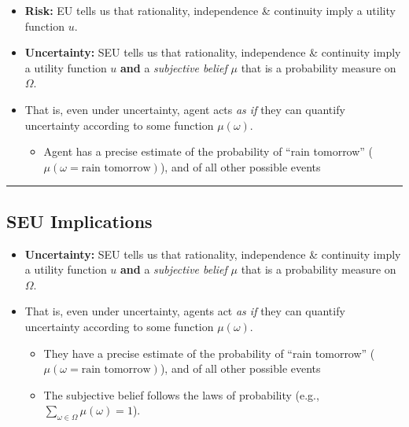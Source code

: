 \documentclass[
  letterpaper,
  DIV=11,
  numbers=noendperiod]{scrartcl}
\providecommand{\tightlist}{%
  \setlength{\itemsep}{0pt}\setlength{\parskip}{0pt}}\usepackage{longtable,booktabs,array}
\begin{document}
\begin{itemize}
\tightlist
\item
  \textbf{Risk:} EU tells us that rationality, independence \&
  continuity imply a utility function \(u\).
\item
  \textbf{Uncertainty:} SEU tells us that rationality, independence \&
  continuity imply a utility function \(u\) \textbf{and} a
  \emph{subjective belief} \(\mu\) that is a probability measure on
  \(\Omega\).
\item
  That is, even under uncertainty, agent acts \emph{as if} they can
  quantify uncertainty according to some function \(\mu(\omega)\).

  \begin{itemize}
  \tightlist
  \item
    Agent has a precise estimate of the probability of ``rain tomorrow''
    (\(\mu(\omega=\text{rain tomorrow})\)), and of all other possible
    events
  \end{itemize}
\end{itemize}

\begin{center}\rule{0.5\linewidth}{0.5pt}\end{center}

\subsection{SEU Implications}\label{seu-implications-1}

\begin{itemize}
\tightlist
\item
  \textbf{Uncertainty:} SEU tells us that rationality, independence \&
  continuity imply a utility function \(u\) \textbf{and} a
  \emph{subjective belief} \(\mu\) that is a probability measure on
  \(\Omega\).
\item
  That is, even under uncertainty, agents act \emph{as if} they can
  quantify uncertainty according to some function \(\mu(\omega)\).

  \begin{itemize}
  \tightlist
  \item
    They have a precise estimate of the probability of ``rain tomorrow''
    (\(\mu(\omega=\text{rain tomorrow})\)), and of all other possible
    events
  \item
    The subjective belief follows the laws of probability (e.g.,
    \(\sum_{\omega\in\Omega}\mu(\omega) = 1\)).\\
  \end{itemize}
\end{itemize}
\end{document}
